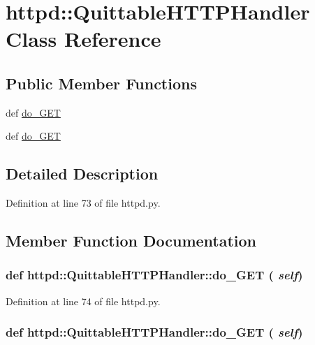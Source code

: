 \hypertarget{classhttpd_1_1_quittable_h_t_t_p_handler}{
\section{httpd::QuittableHTTPHandler Class Reference}
\label{classhttpd_1_1_quittable_h_t_t_p_handler}
}
\subsection*{Public Member Functions}
\begin{DoxyCompactItemize}
\item 
def \hyperlink{classhttpd_1_1_quittable_h_t_t_p_handler_addc36268dbff72748204a5baae7a6e5b}{do\_\-GET}
\item 
def \hyperlink{classhttpd_1_1_quittable_h_t_t_p_handler_addc36268dbff72748204a5baae7a6e5b}{do\_\-GET}
\end{DoxyCompactItemize}


\subsection{Detailed Description}


Definition at line 73 of file httpd.py.



\subsection{Member Function Documentation}
\hypertarget{classhttpd_1_1_quittable_h_t_t_p_handler_addc36268dbff72748204a5baae7a6e5b}{
\subsubsection[{do\_\-GET}]{\setlength{\rightskip}{0pt plus 5cm}def httpd::QuittableHTTPHandler::do\_\-GET ( {\em self})}}
\label{classhttpd_1_1_quittable_h_t_t_p_handler_addc36268dbff72748204a5baae7a6e5b}


Definition at line 74 of file httpd.py.

\hypertarget{classhttpd_1_1_quittable_h_t_t_p_handler_addc36268dbff72748204a5baae7a6e5b}{
\subsubsection[{do\_\-GET}]{\setlength{\rightskip}{0pt plus 5cm}def httpd::QuittableHTTPHandler::do\_\-GET ( {\em self})}}
\label{classhttpd_1_1_quittable_h_t_t_p_handler_addc36268dbff72748204a5baae7a6e5b}


